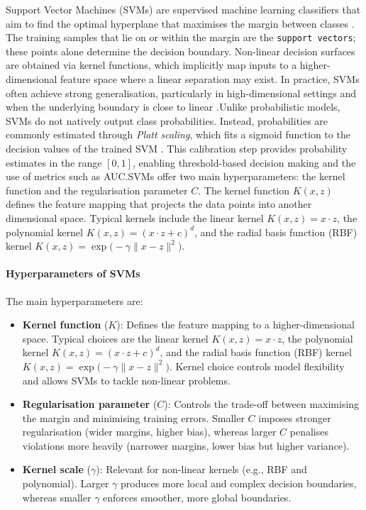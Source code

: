 Support Vector Machines (SVMs) are supervised machine learning classifiers that aim to find the optimal hyperplane that maximises the margin between classes \citep{Cortes1995}. The training samples that lie on or within the margin are the \texttt{support vectors}; these points alone determine the decision boundary. Non-linear decision surfaces are obtained via kernel functions, which implicitly map inputs to a higher-dimensional feature space where a linear separation may exist. In practice, SVMs often achieve strong generalisation, particularly in high-dimensional settings and when the underlying boundary is close to linear \citep{chang2011guide}.Unlike probabilistic models, SVMs do not natively output class probabilities. Instead, probabilities are commonly estimated through \textit{Platt scaling}, which fits a sigmoid function to the decision values of the trained SVM \citep{Platt1999}. This calibration step provides probability estimates in the range $[0,1]$, enabling threshold-based decision making and the use of metrics such as AUC.SVMs offer two main hyperparameters: the kernel function and the regularisation parameter $C$. The kernel function $K(x,z)$ defines the feature mapping that projects the data points into another dimensional space. Typical kernels include the linear kernel $K(x,z)=x \cdot z$, the polynomial kernel $K(x,z)=(x \cdot z + c)^d$, and the radial basis function (RBF) kernel $K(x,z)=\exp\!\big(-\gamma \lVert x-z\rVert^2\big)$.\paragraph{Hyperparameters of SVMs} The main hyperparameters are:

\begin{itemize}
    \item \textbf{Kernel function} ($K$): Defines the feature mapping to a higher-dimensional space. Typical choices are the linear kernel $K(x,z)=x \cdot z$, the polynomial kernel $K(x,z)=(x \cdot z + c)^d$, and the radial basis function (RBF) kernel $K(x,z)=\exp\!\big(-\gamma \lVert x-z\rVert^2\big)$. Kernel choice controls model flexibility and allows SVMs to tackle non-linear problems.
    \item \textbf{Regularisation parameter} ($C$): Controls the trade-off between maximising the margin and minimising training errors. Smaller $C$ imposes stronger regularisation (wider margins, higher bias), whereas larger $C$ penalises violations more heavily (narrower margins, lower bias but higher variance). 
    \item \textbf{Kernel scale} ($\gamma$): Relevant for non-linear kernels (e.g., RBF and polynomial). Larger $\gamma$ produces more local and complex decision boundaries, whereas smaller $\gamma$ enforces smoother, more global boundaries.
\end{itemize}

